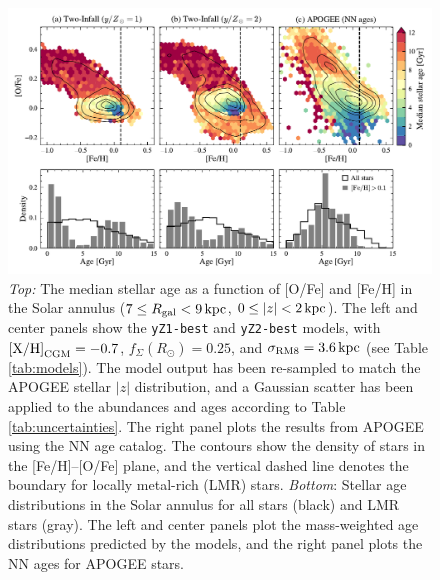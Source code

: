 \documentclass[twocolumn,twocolappendix,linenumbers]{aastex631}
\newcommand{\kpc}{\,{\rm kpc}}
\begin{document}
\begin{figure}
    \centering
    \includegraphics[width=\textwidth]{figures/lmr_ages.pdf}
    \caption{{\it Top:} The median stellar age as a function of [O/Fe] and [Fe/H] in the Solar annulus ($7\leq R_{\rm gal}<9\kpc$, $0\leq|z|<2\kpc$). The left and center panels show the {\tt yZ1-best} and {\tt yZ2-best} models, with ${\rm [X/H]}_{\rm CGM}=-0.7$, $f_\Sigma(R_\odot)=0.25$, and $\sigma_{\rm RM8}=3.6\kpc$ (see Table \ref{tab:models}). The model output has been re-sampled to match the APOGEE stellar $|z|$ distribution, and a Gaussian scatter has been applied to the abundances and ages according to Table \ref{tab:uncertainties}. The right panel plots the results from APOGEE using the \citet{leung_variational_2023} NN age catalog. The contours show the density of stars in the [Fe/H]--[O/Fe] plane, and the vertical dashed line denotes the boundary for locally metal-rich (LMR) stars.
    {\it Bottom}: Stellar age distributions in the Solar annulus for all stars (black) and LMR stars (gray). The left and center panels plot the mass-weighted age distributions predicted by the models,
    and the right panel plots the NN ages for APOGEE stars.
    }
    \label{fig:lmr-ages}
\end{figure}
\end{document}
